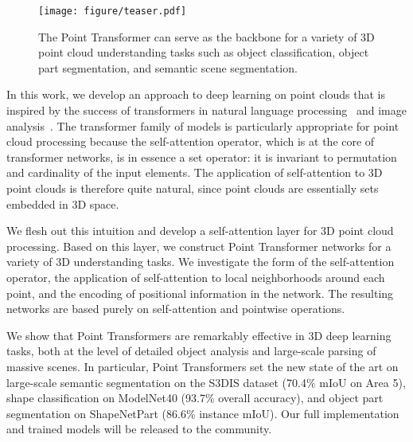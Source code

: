 \documentclass[final]{cvpr}
\begin{document}
\begin{figure}
	\begin{center}
		\texttt{[image: figure/teaser.pdf]}
	\end{center}
	\caption{The Point Transformer can serve as the backbone for a variety of 3D point cloud understanding tasks such as object classification, object part segmentation, and semantic scene segmentation.}
	\label{fig:application}
\end{figure}

In this work, we develop an approach to deep learning on point clouds that is inspired by the success of transformers in natural language processing~\cite{vaswani2017attention,wu2019pay,Devlin2018,dai2019transformer,Yang2019xlnet} and image analysis~\cite{hu2019local,ramachandran2019stand,zhao2020san}. The transformer family of models is particularly appropriate for point cloud processing because the self-attention operator, which is at the core of transformer networks, is in essence a set operator: it is invariant to permutation and cardinality of the input elements. The application of self-attention to 3D point clouds is therefore quite natural, since point clouds are essentially sets embedded in 3D space.

We flesh out this intuition and develop a self-attention layer for 3D point cloud processing. Based on this layer, we construct Point Transformer networks for a variety of 3D understanding tasks. We investigate the form of the self-attention operator, the application of self-attention to local neighborhoods around each point, and the encoding of positional information in the network. The resulting networks are based purely on self-attention and pointwise operations.

We show that Point Transformers are remarkably effective in 3D deep learning tasks, both at the level of detailed object analysis and large-scale parsing of massive scenes. In particular, Point Transformers set the new state of the art on large-scale semantic segmentation on the S3DIS dataset (70.4\% mIoU on Area 5), shape classification on ModelNet40 (93.7\% overall accuracy), and object part segmentation on ShapeNetPart (86.6\% instance mIoU). Our full implementation and trained models will be released to the community.
\end{document}

